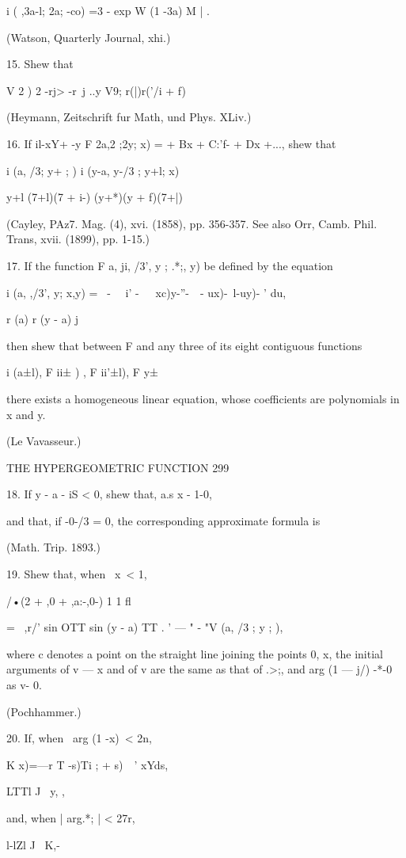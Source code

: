 i ( ,3a-l; 2a; -co) =3 - exp W (1 -3a) M | .

(Watson, Quarterly Journal, xhi.)

15. Shew that

V 2 ) 2 -rj> -r\ j ..y V9; r(|)r('/i + f)

(Heymann, Zeitschrift fur Math, und Phys. XLiv.)

16. If il-xY+ -y F 2a,2 ;2y; x) = + Bx + C:'f- + Dx +..., shew that

i (a, /3; y+ ; ) i (y-a, y-/3 ; y+l; x)

y+l (7+l)(7 + i-) (y+*)(y + f)(7+|)

(Cayley, PAz7. Mag. (4), xvi. (1858), pp. 356-357. See also Orr, Camb.
Phil. Trans, xvii. (1899), pp. 1-15.)

17. If the function F a, ji, /3', y ; .*;, y) be defined by the
equation

i (a, ,/3', y; x,y) = \ - \ \ i' -\ \ ~xc)y-''-\ \ - ux)-\ l-uy)- '
du,

r (a) r (y - a) j

then shew that between F and any three of its eight contiguous
functions

i (a±l), F ii± ) , F ii'±l), F y±\ \

there exists a homogeneous linear equation, whose coefficients are
polynomials in x and y.

(Le Vavasseur.)

THE HYPERGEOMETRIC FUNCTION 299

18. If y - a - iS < 0, shew that, a.s x - 1-0,

and that, if -0-/3 = 0, the corresponding approximate formula is

(Math. Trip. 1893.)

19. Shew that, when \ x\ < 1,

/•(2 + ,0 + ,a:-,0-) 1 1 fl

= \ ,r/' sin OTT sin (y - a) TT . ' — " - "V (a, /3 ; y ; ),

where c denotes a point on the straight line joining the points 0, x,
the initial arguments of v — x and of v are the same as that of .>;,
and arg (1 — j/) -*-0 as v- 0.

(Pochhammer.)

20. If, when \ arg (1 -x)\ < 2n,

K x)=—r T -s)Ti ; + s)\ \ ' xYds,

LTTl J \ y, ,

and, when | arg.*; | < 27r,

l-lZl J \ K,-

